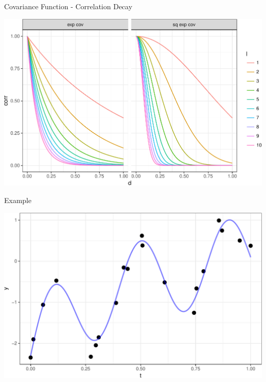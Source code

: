 \documentclass[11pt,ignorenonframetext,]{beamer}
\begin{document}
\begin{frame}{%
\protect\hypertarget{covariance-function---correlation-decay}{%
Covariance Function - Correlation Decay}}

\begin{center}\includegraphics[width=\textwidth]{Lec12_files/figure-beamer/unnamed-chunk-2-1} \end{center}

\end{frame}

\begin{frame}{%
\protect\hypertarget{example}{%
Example}}

\begin{center}\includegraphics[width=\textwidth]{Lec12_files/figure-beamer/unnamed-chunk-3-1} \end{center}

\end{frame}
\end{document}
